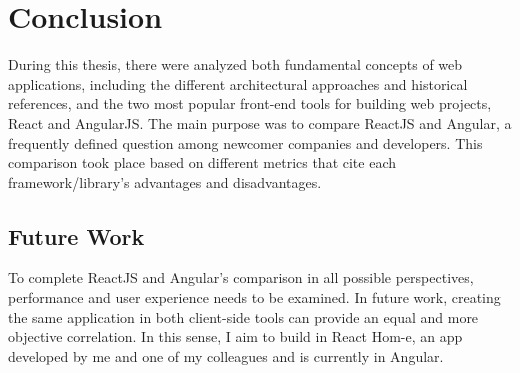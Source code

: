 
\chapter{Conclusion} %
\label{Chapter5} %

During this thesis, there were analyzed both fundamental concepts of web applications, including the different architectural approaches and historical references, and the two most popular front-end tools for building web projects, React and AngularJS. The main purpose was to compare ReactJS and Angular, a frequently defined question among newcomer companies and developers. This comparison took place based on different metrics that cite each framework/library’s advantages and disadvantages. \par

\section{Future Work}
To complete ReactJS and Angular’s comparison in all possible perspectives, performance and user experience needs to be examined. In future work, creating the same application in both client-side tools can provide an equal and more objective correlation. In this sense, I aim to build in React Hom-e, an app developed by me and one of my colleagues and is currently in Angular. \par
